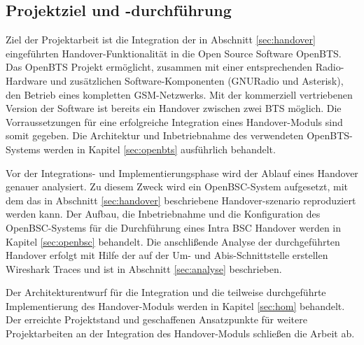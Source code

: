\subsection{Projektziel und -durchführung}

Ziel der Projektarbeit ist die Integration der in Abschnitt \ref{sec:handover} eingeführten Handover-Funktionalität in die Open Source Software OpenBTS. Das OpenBTS Projekt ermöglicht, zusammen mit einer entsprechenden Radio-Hardware und zusätzlichen Software-Komponenten (GNURadio und Asterisk), den Betrieb eines kompletten GSM-Netzwerks. Mit der kommerziell vertriebenen Version der Software ist bereits ein Handover zwischen zwei BTS möglich. Die Vorraussetzungen für eine erfolgreiche Integration eines Handover-Moduls sind somit gegeben. Die Architektur und Inbetriebnahme des verwendeten OpenBTS-Systems werden in Kapitel \ref{sec:openbts} ausführlich behandelt.

Vor der Integrations- und Implementierungsphase wird der Ablauf eines Handover genauer analysiert. Zu diesem Zweck wird ein OpenBSC-System aufgesetzt, mit dem das in Abschnitt \ref{sec:handover} beschriebene Handover-szenario reproduziert werden kann. Der Aufbau, die Inbetriebnahme und die Konfiguration des OpenBSC-Systems für die Durchführung eines Intra BSC Handover werden in Kapitel \ref{sec:openbsc} behandelt. Die anschlißende Analyse der durchgeführten Handover erfolgt mit Hilfe der auf der Um- und Abis-Schnittstelle erstellen Wireshark Traces und ist in Abschnitt \ref{sec:analyse} beschrieben.

Der Architekturentwurf für die Integration und die teilweise durchgeführte Implementierung des Handover-Moduls werden in Kapitel \ref{sec:hom} behandelt. Der erreichte Projektstand und geschaffenen Ansatzpunkte für weitere Projektarbeiten an der Integration des Handover-Moduls schließen die Arbeit ab.


